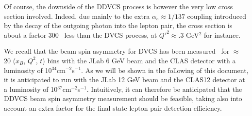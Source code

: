 Of course, the downside of the DDVCS process is however the very low cross section
involved. Indeed, due mainly to the extra $\alpha_e\approx 1/137$ coupling
introduced by the decay of the outgoing photon into the lepton pair,
the cross section is about a factor 300~\cite{Guidal:2002kt} less than the
DVCS process, at $Q'^2\approx .3$ GeV$^2$ for instance. 

We recall that the beam spin asymmetry for DVCS has been measured~\cite{fx}
for $\approx$ 20 ($x_B$, $Q^2$, $t$) bins with the JLab 6 GeV beam 
and the CLAS detector with a luminosity of 10$^{34}$cm$^{-2}$s$^{-1}$.
As we will be shown in the following of this document, it is anticipated
to run with the JLab 12 GeV beam and the CLAS12 detector at a luminosity
of 10$^{37}$cm$^{-2}$s$^{-1}$. Intuitively, it can therefore be anticipated
that the DDVCS beam spin asymmetry measurement should be feasible,
taking also into account an extra factor for the final state lepton pair
detection efficiency.

%
